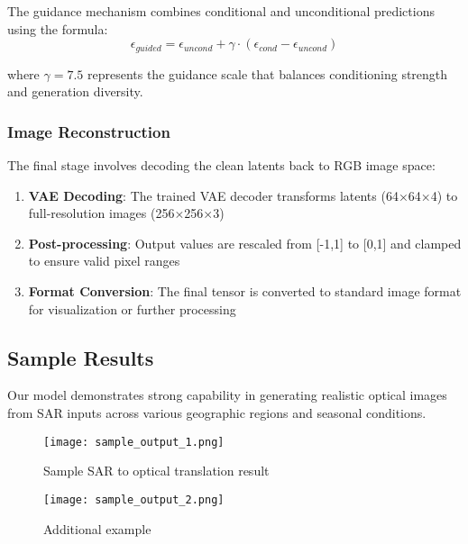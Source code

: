 The guidance mechanism combines conditional and unconditional predictions using the formula:
\begin{equation}
\epsilon_{guided} = \epsilon_{uncond} + \gamma \cdot (\epsilon_{cond} - \epsilon_{uncond})
\end{equation}

where $\gamma = 7.5$ represents the guidance scale that balances conditioning strength and generation diversity.

\subsubsection{Image Reconstruction}

The final stage involves decoding the clean latents back to RGB image space:

\begin{enumerate}
    \item \textbf{VAE Decoding}: The trained VAE decoder transforms latents (64×64×4) to full-resolution images (256×256×3)
    \item \textbf{Post-processing}: Output values are rescaled from [-1,1] to [0,1] and clamped to ensure valid pixel ranges
    \item \textbf{Format Conversion}: The final tensor is converted to standard image format for visualization or further processing
\end{enumerate}

\subsection{Sample Results}

Our model demonstrates strong capability in generating realistic optical images from SAR inputs across various geographic regions and seasonal conditions. 

\begin{figure}[h!]
    \centering
    \texttt{[image: sample\_output\_1.png]}
    \caption{Sample SAR to optical translation result}
    \label{fig:sample_output_1}
\end{figure}

\begin{figure}[h!]
    \centering
    \texttt{[image: sample\_output\_2.png]}
    \caption{Additional example}
    \label{fig:sample_output_2}
\end{figure}

